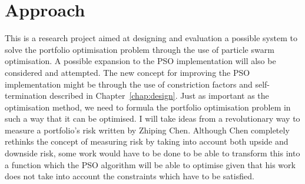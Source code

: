 
  \section{Approach} %
  \label{sec:approach}
  This is a research project aimed at designing and evaluation a possible system to solve the portfolio optimisation problem through the use of particle swarm optimisation. A possible expansion to the PSO implementation \cite{haskellPSO} will also be considered and attempted. The new concept for improving the PSO implementation might be through the use of constriction factors and self-termination described in Chapter~\ref{chap:design}. Just as important as the optimisation method, we need to formula the portfolio optimisation problem in such a way that it can be optimised. I will take ideas from a revolutionary way to measure a portfolio's risk \cite{two_sided_risk} written by Zhiping Chen. Although Chen completely rethinks the concept of measuring risk by taking into account both upside and downside risk, some work would have to be done to be able to transform this into a function which the PSO algorithm will be able to optimise given that his work does not take into account the constraints which have to be satisfied. 

